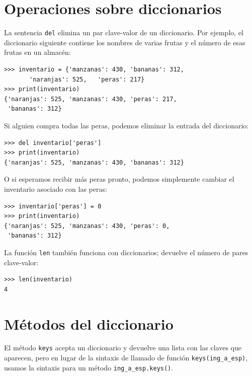 \section{Operaciones sobre diccionarios}

 

La sentencia \texttt{del} elimina un par clave-valor de un diccionario.
Por ejemplo, el diccionario siguiente contiene los nombres de varias
frutas y el número de esas frutas en un almacén:
\begin{lstlisting}
>>> inventario = {'manzanas': 430, 'bananas': 312, 
       'naranjas': 525,   'peras': 217}
>>> print(inventario)
{'naranjas': 525, 'manzanas': 430, 'peras': 217, 
 'bananas': 312}
\end{lstlisting}
 Si alguien compra todas las peras, podemos eliminar la entrada del
diccionario:
\begin{lstlisting}
>>> del inventario['peras']
>>> print(inventario)
{'naranjas': 525, 'manzanas': 430, 'bananas': 312}
\end{lstlisting}
O si esperamos recibir más peras pronto, podemos simplemente cambiar
el inventario asociado con las peras:
\begin{lstlisting}
>>> inventario['peras'] = 0
>>> print(inventario)
{'naranjas': 525, 'manzanas': 430, 'peras': 0, 
 'bananas': 312}
\end{lstlisting}
 La función \texttt{len} también funciona con diccionarios; devuelve
el número de pares clave-valor:
\begin{lstlisting}
>>> len(inventario)
4
\end{lstlisting}
\section{Métodos del diccionario}

  
 

El método \texttt{keys} acepta un diccionario y devuelve una lista
con las claves que aparecen, pero en lugar de la sintaxis de llamado
de función \texttt{keys(ing\_a\_esp)}, usamos la sintaxis para un
método \texttt{ing\_a\_esp.keys()}.


